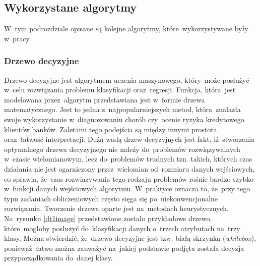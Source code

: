 \subsection{Wykorzystane algorytmy}
W~tym podrozdziale opisane są kolejne algorytmy, które~wykorzystywane były w~pracy.
\subsubsection{Drzewo decyzyjne}
Drzewo decyzyjne jest algorytmem uczenia maszynowego, który~może posłużyć w~celu rozwiązania problemu klasyfikacji oraz~regresji. Funkcja, która~jest modelowana przez~algorytm przedstawiana jest w~formie drzewa matematycznego. Jest to jedna z~najpopularniejszych metod, która~znalazła swoje wykorzystanie w~diagnozowaniu chorób czy~ocenie ryzyka kredytowego klientów banków\cite{mitchel}. Zaletami tego podejścia są między innymi  prostota oraz~łatwość interpretacji. Dużą wadą drzew decyzyjnych jest fakt, iż~stworzenia optymalnego drzewa decyzyjnego nie należy do~problemów rozwiązywalnych w~czasie wielomianowym, lecz do~problemów trudnych tzn. takich, których czas działania nie jest ogarniczony przez~wielomian od~rozmiaru danych wejściowych, co sprawia, że~czas rozwiązywania tego rodzaju problemów rośnie bardzo szybko w~funkcji danych wejściowych algorytmu. W~praktyce oznacza to, że~przy tego typu zadaniach obliczeniowych często sięga się po~niekonwencjonalne rozwiązania. Tworzenie drzewa oparte jest na~metodach heurystycznych\cite{dtscikit}. Na~rysunku \ref{dt1image} przedstawione zostało przykładowe drzewo, które~mogłoby posłużyć do~klasyfikacji danych o~trzech atrybutach na~trzy klasy. Można stwierdzić, że~drzewo decyzyjne jest tzw. białą skrzynką (\textit{whitebox}), ponieważ~łatwo można zauważyć na~jakiej podstawie podjęta została decyzja przyporządkowania do~danej klasy.

